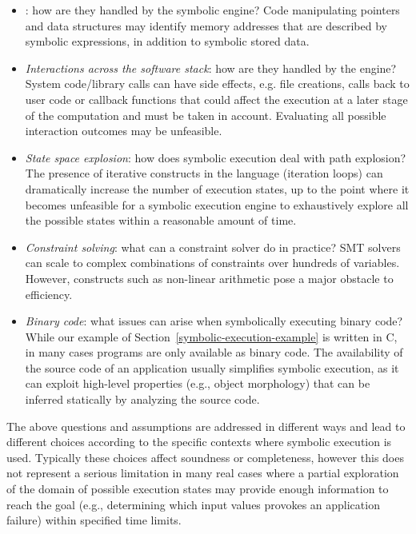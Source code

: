 \begin{itemize}
	\item {}: how are they handled by the symbolic engine? Code manipulating pointers and data structures may identify memory addresses that are described by symbolic expressions, in addition to symbolic stored data.
	\item {\em Interactions across the software stack}: how are they handled by the engine? System code/library calls can have side effects, e.g. file creations, calls back to user code or callback functions that could affect the execution at a later stage of the computation and must be taken in account. 
	Evaluating all possible interaction outcomes may be unfeasible.
	\item {\em State space explosion}: how does symbolic execution deal with path explosion? The presence of iterative constructs in the language (iteration loops) can dramatically increase the number of execution states, up to the point where it becomes unfeasible for a symbolic execution engine to exhaustively explore all the possible states within a reasonable amount of time. 
	\item {\em Constraint solving}: what can a constraint solver do in practice?
	SMT solvers can scale to complex combinations of constraints over hundreds of variables. However, constructs such as non-linear arithmetic pose a major obstacle to efficiency.
	\item {\em Binary code}: what issues can arise when symbolically executing binary code?
	While our example of Section~\ref{symbolic-execution-example} is written in C, in many cases programs are only available as binary code. The availability of the source code of an application usually simplifies symbolic execution, as it can exploit high-level properties (e.g., object morphology) that can be inferred statically by analyzing the source code.
\end{itemize}

\noindent The above questions and assumptions are addressed in different ways and lead to different choices according to the specific contexts where symbolic execution is used. Typically these choices affect soundness or completeness, however this does not represent a serious limitation in many real cases where a partial exploration of the domain of possible execution states may provide enough information to reach the goal (e.g., determining which input values provokes an application failure) within specified time limits.

